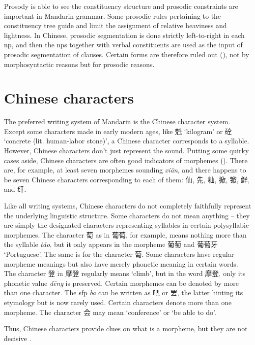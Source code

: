 \documentclass[UTF8, a4paper, oneside, scheme=plain, 12pt]{ctexrep}
\newcommand{\form}[1]{\emph{#1}}
\newcommand{\translate}[1]{`#1'}
\begin{document}
Prosody is able to see the constituency structure
and prosodic constraints are important in Mandarin grammar.
Some prosodic rules pertaining to the constituency tree 
guide and limit the assignment of relative heaviness and lightness.
In Chinese, prosodic segmentation is done strictly left-to-right 
in each \ac{np},
and then the \ac{np}s together with verbal constituents 
are used as the input of prosodic segmentation of clauses.
Certain forms are therefore ruled out
(), 
not by morphosyntactic reasons but for prosodic reasons.

\section{Chinese characters}\label{sec:chinese-character}

The preferred writing system of Mandarin is the Chinese character system.
Except some characters made in early modern ages,
like 兛 \translate{kilogram} or 砼 \translate{concrete (lit. human-labor stone)},
a Chinese character corresponds to a syllable.
However, Chinese characters don't just represent the sound.
Putting some quirky cases aside,
Chinese characters are often good indicators of morphemes
().
There are, for example, at least seven morphemes sounding \form{xi\={a}n},
and there happens to be seven Chinese characters corresponding to each of them:
仙, 先, 籼, 掀, 锨, 鲜, and 纤.

Like all writing systems, 
Chinese characters do not completely faithfully represent 
the underlying linguistic structure.
Some characters do not mean anything -- 
they are simply the designated characters representing syllables 
in certain polysyllabic morphemes.
The character 萄 as in 葡萄, for example, 
means nothing more than the syllable \form{t\'{a}o},
but it only appears in the morpheme 葡萄 and 葡萄牙 \translate{Portuguese}.
The same is for the character 葡.
Some characters have regular morpheme meanings
but also have merely phonetic meaning in certain words.
The character 登 in 摩登 regularly means \translate{climb},
but in the word 摩登, only its phonetic value \form{d\={e}ng} is preserved.
Certain morphemes can be denoted by more than one character.
The \ac{sfp} \form{ba} can be written as 吧 or 罢,
the latter hinting its etymology but is now rarely used.
Certain characters denote more than one morpheme.
The character 会 may mean \translate{conference} or \translate{be able to do}. 

Thus, Chinese characters provide clues on what is a morpheme,
but they are not decisive \citep[1.1.4]{zhudexigrammar}.
\end{document}
